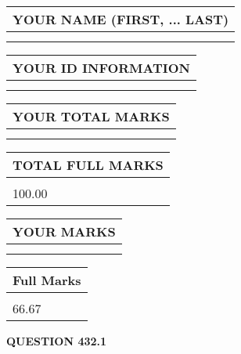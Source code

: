\documentclass{ctexart}
\begin{document}
   
   
   
\newpage 
\setcounter{page}{ 
   432001 } 
   
   
   
   
\noindent\begin{tabular}{|l|}
\hline
YOUR NAME (FIRST, ... LAST)  \\
\hline
 \\ 
 \\ 
\hline
\end{tabular}
\hspace{0.05in} \begin{tabular}{|l|}
\hline
 YOUR   ID   INFORMATION  \\
\hline
 \\ 
 \\ 
\hline
\end{tabular}
   
   
\vspace{0.2in}\noindent\begin{tabular}{|l|}
\hline
YOUR TOTAL MARKS  \\
\hline
 \\ 
 \\ 
\hline
\end{tabular}
\hspace{0.05in} \begin{tabular}{|l|}
\hline
TOTAL FULL MARKS  \\
\hline
 \\ 
100.00 \\
\hline
\end{tabular}
   
   
 \vspace{0.2in}
 
 
 
 
   
   
  
\vspace{0.2in}
  
\noindent\begin{tabular}{|l|}
\hline
 YOUR MARKS  \\
\hline
 \\ 
 \\ 
\hline
\end{tabular}
\hspace{0.05in} \begin{tabular}{|l|}
\hline
 Full Marks  \\
\hline
 \\ 
66.67 \\
\hline
\end{tabular}
{\textbf{\Large{QUESTION
432.1 
}}}
  
\end{document}

